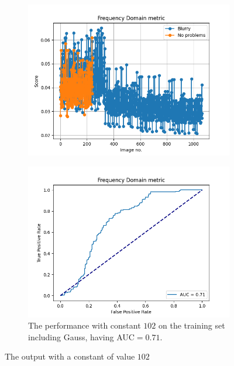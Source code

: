 \begin{figure}[H]
    \begin{subfigure}[t]{0.48\textwidth}
        \includegraphics[width=\textwidth]{Figures/BlurredImages/tweakFM/102_output_basic.png}
        \caption{}
        \label{fig:FM_basic_gauss_102}
    \end{subfigure}\hspace{1em}
    \begin{subfigure}[t]{0.48\textwidth}
        \includegraphics[width=\textwidth]{Figures/BlurredImages/tweakFM/102_output_roc.png}
        \caption{The performance with constant $102$ on the training set including Gauss, having AUC$=0.71$.}
        \label{fig:FM_roc_gauss_102}
    \end{subfigure}
    \caption{The output with a constant of value $102$}
\end{figure}

